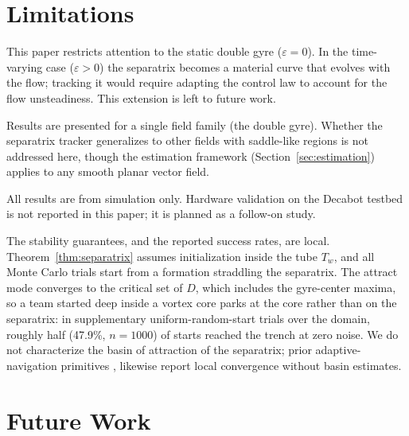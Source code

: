 \documentclass[lettersize,journal]{IEEEtran}
\begin{document}
\section{Limitations}
\label{sec:limitations}

This paper restricts attention to the static double gyre ($\varepsilon = 0$).
In the time-varying case ($\varepsilon > 0$) the separatrix becomes a
material curve that evolves with the flow; tracking it would require
adapting the control law to account for the flow unsteadiness. This
extension is left to future work.

Results are presented for a single field family (the double gyre). Whether
the separatrix tracker generalizes to other fields with saddle-like
regions is not addressed here, though the estimation framework
(Section~\ref{sec:estimation}) applies to any smooth planar vector field.

All results are from simulation only. Hardware validation on the Decabot
testbed is not reported in this paper; it is planned as a follow-on study.

The stability guarantees, and the reported success rates, are local.
Theorem~\ref{thm:separatrix} assumes initialization inside the tube
$T_w$, and all Monte Carlo trials start from a formation straddling the
separatrix. The attract mode converges to the critical set of $D$, which
includes the gyre-center maxima, so a team started deep inside a vortex
core parks at the core rather than on the separatrix: in supplementary
uniform-random-start trials over the domain, roughly half (47.9\%,
$n = 1000$) of starts reached the trench at zero noise. We do not
characterize the basin of attraction of the separatrix; prior
adaptive-navigation primitives \cite{27}, \cite{28} likewise report local
convergence without basin estimates.


\section{Future Work}
\label{sec:future}
\end{document}

